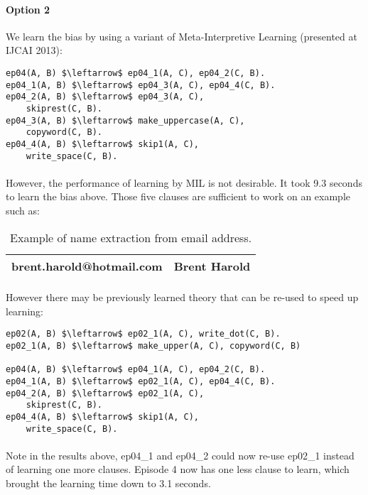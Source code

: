 \documentclass{article}
\theoremstyle{plain}
\theoremstyle{definition}
\begin{document}
\begin{multicols}{2}
\paragraph{Option 2} We learn the bias by using a variant of Meta-Interpretive Learning (presented at IJCAI 2013):

\begin{lstlisting}[mathescape=true]
ep04(A, B) $\leftarrow$ ep04_1(A, C), ep04_2(C, B).
ep04_1(A, B) $\leftarrow$ ep04_3(A, C), ep04_4(C, B).
ep04_2(A, B) $\leftarrow$ ep04_3(A, C),
	skiprest(C, B).
ep04_3(A, B) $\leftarrow$ make_uppercase(A, C),
	copyword(C, B).
ep04_4(A, B) $\leftarrow$ skip1(A, C),
	write_space(C, B).
\end{lstlisting}

\paragraph{} However, the performance of learning by MIL is not desirable. It took 9.3 seconds to learn the bias above. Those five clauses are sufficient to work on an example such as:

\begin{table}[H]
\centering\footnotesize
\begin{tabular}{ | l | l | }
\hline
brent.harold@hotmail.com & Brent Harold\\
\hline
\end{tabular}
\caption{Example of name extraction from email address.}\label{table:Flashfill}
\end{table}

\paragraph{} However there may be previously learned theory that can be re-used to speed up learning:

\begin{lstlisting}[mathescape=true]
ep02(A, B) $\leftarrow$ ep02_1(A, C), write_dot(C, B).
ep02_1(A, B) $\leftarrow$ make_upper(A, C), copyword(C, B)

ep04(A, B) $\leftarrow$ ep04_1(A, C), ep04_2(C, B).
ep04_1(A, B) $\leftarrow$ ep02_1(A, C), ep04_4(C, B).
ep04_2(A, B) $\leftarrow$ ep02_1(A, C),
	skiprest(C, B).
ep04_4(A, B) $\leftarrow$ skip1(A, C),
	write_space(C, B).
\end{lstlisting}

\paragraph{} Note in the results above, ep04\_1 and ep04\_2 could now re-use ep02\_1 instead of learning one more clauses. Episode 4 now has one less clause to learn, which brought the learning time down to 3.1 seconds.


\end{multicols}
\end{document}
